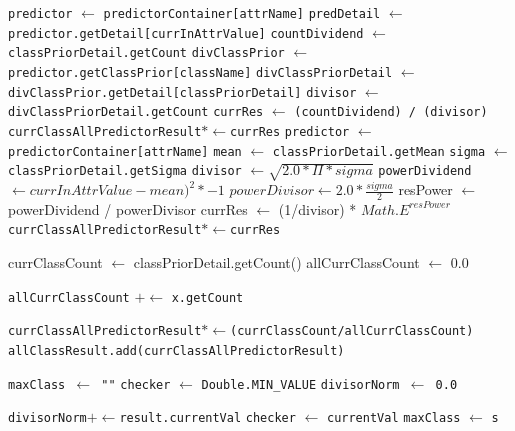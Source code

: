 \begin{enumerate}
\begin{itemize}
\begin{enumerate}
\begin{algorithm}[H]
\begin{algorithmic}[1]
							\State \texttt{predictor} $\gets$ \texttt{predictorContainer[attrName]}
							\State \texttt{predDetail} $\gets$ \texttt{predictor.getDetail[currInAttrValue]}
							\State \texttt{countDividend} $\gets$ \texttt{classPriorDetail.getCount}
							\State \texttt{divClassPrior} $\gets$ \texttt{predictor.getClassPrior[className]}
							\State \texttt{divClassPriorDetail} $\gets$ \texttt{divClassPrior.getDetail[classPriorDetail]}
							\State \texttt{divisor} $\gets$ \texttt{divClassPriorDetail.getCount}
							\State \texttt{currRes} $\gets$ \texttt{(countDividend) / (divisor)}
							\State \texttt{currClassAllPredictorResult}$*\gets$\texttt{currRes}
							\State \texttt{predictor} $\gets$ \texttt{predictorContainer[attrName]}
							\State \texttt{mean} $\gets$ \texttt{classPriorDetail.getMean}
							\State \texttt{sigma} $\gets$ \texttt{classPriorDetail.getSigma}
							\State \texttt{divisor} $\gets \sqrt{2.0 * \Pi * sigma}$
							\State \texttt{powerDividend} $\gets currInAttrValue - mean)^2 * -1$
							\State $powerDivisor \gets 2.0 * \frac{sigma}{2}$
							\State resPower $\gets$ powerDividend / powerDivisor
							\State currRes $\gets$ (1/divisor) * $Math.E^{resPower}$
							\State \texttt{currClassAllPredictorResult}$*\gets$\texttt{currRes}
						\EndIf
						
						\State currClassCount $\gets$ classPriorDetail.getCount()
						\State allCurrClassCount $\gets$ 0.0

							\State \texttt{allCurrClassCount} $+\gets$ \texttt{x.getCount}
						\EndFor
												
						\State \texttt{currClassAllPredictorResult}$*\gets$\texttt{(currClassCount/allCurrClassCount)}
						\State \texttt{allClassResult.add(currClassAllPredictorResult)}
					\EndFor					
					
				\EndFor
				
				\State \texttt{maxClass $\gets$ ""}
				\State \texttt{checker} $\gets$ \texttt{Double.MIN}\verb|_|\texttt{VALUE}
				\State \texttt{divisorNorm $\gets$ 0.0}
				
					\State \texttt{divisorNorm}$+\gets$\texttt{result.currentVal}
						\State \texttt{checker} $\gets$ \texttt{currentVal}
          				\State \texttt{maxClass} $\gets$ \texttt{s}
					\EndIf
				\EndFor
				

\end{algorithmic}
\end{algorithm}
\end{enumerate}
\end{itemize}
\end{enumerate}
